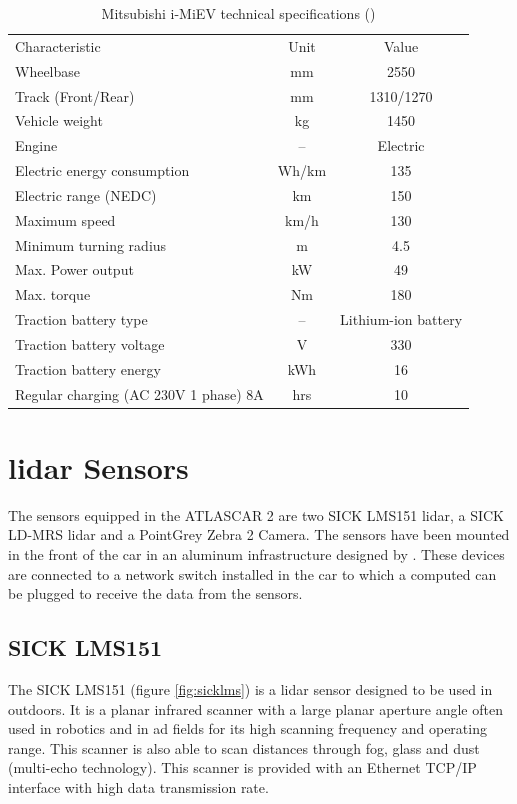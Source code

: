 \begin{table}[!h]
	\centering
	\caption{Mitsubishi i-MiEV technical specifications (\cite{MITSUBISHIMOTORS})}
	\label{tab: MiEV technical}
	\begin{tabular}{lcc}
		Characteristic & Unit & Value\\
		Wheelbase & mm & 2550\\
		Track (Front/Rear) & mm & 1310/1270 \\
		Vehicle weight & kg  & 1450 \\
		\hline
		Engine & -- & Electric \\
		Electric energy consumption & Wh/km & 135 \\
		Electric range (NEDC)  & km & 150 \\
		Maximum speed & km/h & 130 \\
		Minimum turning radius & m & 4.5 \\
		Max. Power output & kW & 49 \\
		Max. torque & Nm & 180 \\
		\hline
		Traction battery type & -- & Lithium-ion battery \\
		Traction battery voltage & V & 330 \\
		Traction battery energy & kWh & 16 \\
		Regular charging (AC 230V 1 phase) 8A & hrs & 10 \\
	\end{tabular}
\end{table}

\section{\gls{lidar} Sensors}

The sensors equipped in the ATLASCAR 2 are two SICK LMS151 \gls{lidar}, a SICK LD-MRS \gls{lidar} and a PointGrey Zebra 2 Camera. The sensors have been mounted in the front of the car in an aluminum infrastructure designed by \cite{Correia2017}. These devices are connected to a network switch installed in the car to which a computed can be plugged to receive the data from the sensors.

\subsection{SICK LMS151}

The SICK LMS151 (figure \ref{fig:sicklms}) is a \gls{lidar} sensor designed to be used in outdoors. It is a planar infrared scanner with a large planar aperture angle often used in robotics and in \gls{ad} fields for its high scanning frequency and operating range. This scanner is also able to scan distances through fog, glass and dust (multi-echo technology). This scanner is provided with an Ethernet TCP/IP interface with high data transmission rate. \cite{SICK}

